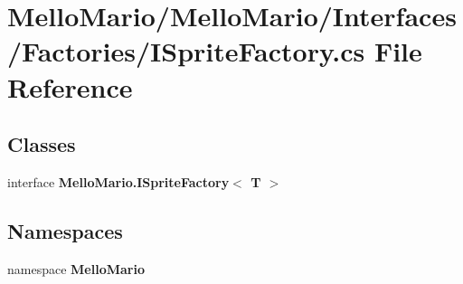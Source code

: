 \section{Mello\+Mario/\+Mello\+Mario/\+Interfaces/\+Factories/\+I\+Sprite\+Factory.cs File Reference}
\label{ISpriteFactory_8cs}
\subsection*{Classes}
\begin{DoxyCompactItemize}
\item 
interface \textbf{ Mello\+Mario.\+I\+Sprite\+Factory$<$ T $>$}
\end{DoxyCompactItemize}
\subsection*{Namespaces}
\begin{DoxyCompactItemize}
\item 
namespace \textbf{ Mello\+Mario}
\end{DoxyCompactItemize}
